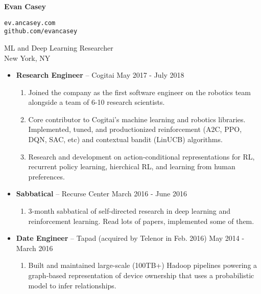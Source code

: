 \documentclass[11pt]{article}
\renewcommand{\section}[1]
{\vspace{1.0\baselineskip}{\Large\textbf{#1}}}
\begin{document}
\thispagestyle{empty}

\parbox[c][0.5in]{3.4in}{\huge \textbf{Evan Casey}}
\parbox[c][0.5in]{2.5in}{%
\small
\vspace{17ex}
\texttt{ev.ancasey.com} \\
\texttt{github.com/evancasey}
}

ML and Deep Learning Researcher \\
New York, NY 

\section{Experience}

\begin{itemize}[leftmargin=12pt]
  \item[] \textbf{Research Engineer} -- Cogitai \hfill May 2017 - July 2018
    \begin{enumerate}[leftmargin=2em,labelindent=16pt,label=$\bullet$]
      \item Joined the company as the first software engineer on the robotics team alongside a team of 6-10 research scientists.
      \item Core contributor to Cogitai's machine learning and robotics libraries. Implemented, tuned, and productionized reinforcement (A2C, PPO, DQN, SAC, etc) and contextual bandit (LinUCB) algorithms.
      \item Research and development on action-conditional representations for RL, recurrent policy learning, hierchical RL, and learning from human preferences.
    \end{enumerate}
  \item[] \textbf{Sabbatical} -- Recurse Center \hfill March 2016 - June 2016
    \begin{enumerate}[leftmargin=2em,labelindent=16pt,label=$\bullet$]
      \item 3-month sabbatical of self-directed research in deep learning and reinforcement learning. Read lots of papers, implemented some of them.
    \end{enumerate}
  \item[] \textbf{Date Engineer} -- Tapad (acquired by Telenor in Feb. 2016) \hfill May 2014 - March 2016 
    \begin{enumerate}[leftmargin=2em,labelindent=16pt,label=$\bullet$]
      \item Built and maintained large-scale (100TB+) Hadoop pipelines powering a graph-based representation of device ownership that uses a probabilistic model to infer relationships.

\end{enumerate}
\end{itemize}
\end{document}
